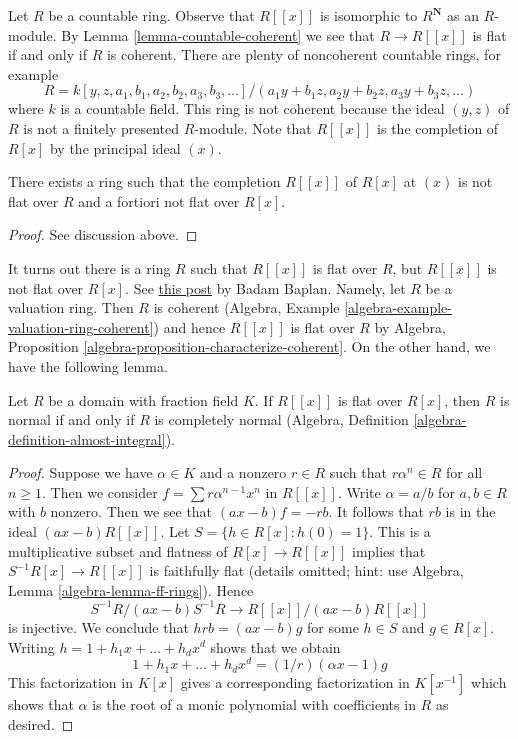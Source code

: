 \noindent
Let $R$ be a countable ring. Observe that $R[[x]]$ is isomorphic to
$R^\mathbf{N}$ as an $R$-module. By Lemma \ref{lemma-countable-coherent}
we see that $R \to R[[x]]$ is flat if and only if $R$ is coherent.
There are plenty of noncoherent countable rings, for example
$$
R = k[y, z, a_1, b_1, a_2, b_2, a_3, b_3, \ldots]/
(a_1 y + b_1 z, a_2 y + b_2 z, a_3 y + b_3 z, \ldots)
$$
where $k$ is a countable field. This ring is not coherent because
the ideal $(y, z)$ of $R$ is not a finitely presented $R$-module.
Note that $R[[x]]$ is the completion of $R[x]$ by the principal
ideal $(x)$.

\begin{lemma}
\label{lemma-completion-polynomial-ring-not-flat}
There exists a ring such that the completion $R[[x]]$ of $R[x]$
at $(x)$ is not flat over $R$ and a fortiori not flat over $R[x]$.
\end{lemma}

\begin{proof}
See discussion above.
\end{proof}

\noindent
It turns out there is a ring $R$ such that $R[[x]]$ is flat
over $R$, but $R[[x]]$ is not flat over $R[x]$. See
\href{https://math.stackexchange.com/users/164860/badam-baplan}{this post}
by Badam Baplan. Namely, let
$R$ be a valuation ring. Then $R$ is coherent (Algebra, Example
\ref{algebra-example-valuation-ring-coherent}) and hence
$R[[x]]$ is flat over $R$ by 
Algebra, Proposition \ref{algebra-proposition-characterize-coherent}.
On the other hand, we have the following lemma.

\begin{lemma}
\label{lemma-almost-integral-when-powerseries-flat}
Let $R$ be a domain with fraction field $K$.
If $R[[x]]$ is flat over $R[x]$, then $R$ is normal if and only
if $R$ is completely normal
(Algebra, Definition \ref{algebra-definition-almost-integral}).
\end{lemma}

\begin{proof}
Suppose we have $\alpha \in K$ and a nonzero $r \in R$ such that
$r \alpha^n \in R$ for all $n \geq 1$. Then we consider
$f = \sum r \alpha^{n - 1} x^n$ in $R[[x]]$. Write $\alpha = a/b$
for $a, b \in R$ with $b$ nonzero. Then we see that $(a x - b)f = -rb$.
It follows that $rb$ is in the ideal $(ax - b)R[[x]]$.
Let $S = \{h \in R[x] : h(0) = 1\}$. This is a multiplicative subset
and flatness of $R[x] \to R[[x]]$ implies that $S^{-1}R[x] \to R[[x]]$
is faithfully flat (details omitted; hint: use Algebra, Lemma
\ref{algebra-lemma-ff-rings}). Hence
$$
S^{-1}R/(ax - b)S^{-1}R \to R[[x]]/(ax - b)R[[x]]
$$
is injective. We conclude that
$h rb = (ax - b) g$ for some $h \in S$ and $g \in R[x]$.
Writing $h = 1 + h_1 x + \ldots + h_d x^d$ shows that we obtain
$$
1 + h_1 x + \ldots + h_d x^d = (1/r)(\alpha x - 1)g
$$
This factorization in $K[x]$ gives a corresponding factorization
in $K[x^{-1}]$ which shows that $\alpha$ is the root of a monic
polynomial with coefficients in $R$ as desired.
\end{proof}

